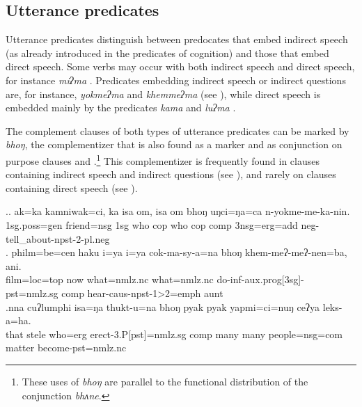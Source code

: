  
\subsection{Utterance predicates}\label{utterance-pred}

Utterance predicates distinguish between predocates that embed in\-direct speech (as already introduced in the predicates of cognition) and those that embed direct speech. Some verbs may occur with both  indirect speech and direct speech, for instance \emph{miʔma} . Predicates embedding indirect speech or indirect questions are, for instance, \emph{yokmeʔma}  and \emph{khemmeʔma}   (see \Next), while direct speech is embedded mainly by the predicates  \emph{kama}  and \emph{luʔma} . 

The complement clauses of both types of utterance predicates can be marked by \emph{bhoŋ}, the complementizer that is also found as a  marker and as conjunction on purpose clauses and  .\footnote{These uses of \emph{bhoŋ} are parallel to the functional distribution of the   conjunction \emph{bhʌne}.} This complementizer is frequently found in clauses containing indirect speech and indirect questions (see \Next), and rarely on clauses containing direct speech (see \NNext[e]).  

\ex.\ag. ak=ka kamniwak=ci,  ka isa om,  isa om bhoŋ     uŋci=ŋa=ca  n-yokme-me-ka-nin.\\
  {\sc 1sg.poss=gen} friend{\sc =nsg} {\sc 1sg} who {\sc cop} who {\sc cop} {\sc comp} {\sc 3nsg=erg=add} {\sc neg}-tell\_about-{\sc npst-2-pl.neg}\\
  
\bg. philm=be=cen       haku i=ya       i=ya           cok-ma-sy-a=na        bhoŋ khem-meʔ-meʔ-nen=ba,       ani.\\
film{\sc =loc=top}  now  what{\sc =nmlz.nc} what{\sc =nmlz.nc}  do{\sc -inf-aux.prog[3sg]-pst=nmlz.sg} {\sc comp}  hear{\sc -caus-npst-1>2=emph} aunt\\ 
 
\bg.nna  cuʔlumphi isa=ŋa   thukt-u=na bhoŋ pyak pyak yapmi=ci=nuŋ ceʔya leks-a=ha.\\
that stele who{\sc =erg} erect{\sc -3.P[pst]=nmlz.sg} {\sc comp} many many people{\sc =nsg=com} matter become{\sc [3sg]-pst=nmlz.nc}	\\

